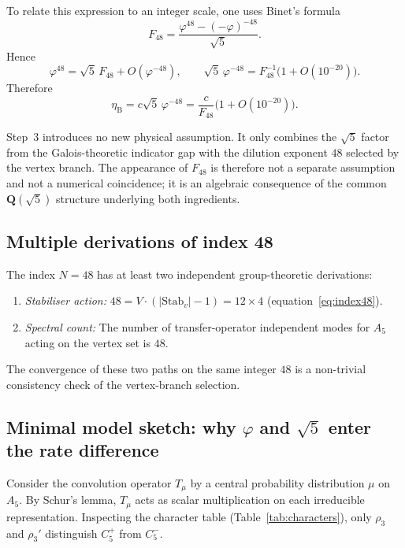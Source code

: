 \documentclass[sn-mathphys-num,Numbered]{sn-jnl}
\theoremstyle{thmstyleone}
\theoremstyle{thmstylethree}
\theoremstyle{thmstyletwo}
\newcommand{\etaB}{\eta_{\mathrm{B}}}
\begin{document}
To relate this expression to an integer scale, one uses Binet's formula
\[
F_{48}=\frac{\varphi^{48}-(-\varphi)^{-48}}{\sqrt{5}}.
\]
Hence
\[
\varphi^{48}=\sqrt{5}\,F_{48}+O(\varphi^{-48}),
\qquad
\sqrt{5}\,\varphi^{-48}=F_{48}^{-1}\bigl(1+O(10^{-20})\bigr).
\]
Therefore
\[
\etaB = c\sqrt{5}\,\varphi^{-48}
     = \frac{c}{F_{48}}\bigl(1+O(10^{-20})\bigr).
\]

Step~3 introduces no new physical assumption. It only combines the
$\sqrt{5}$ factor from the Galois-theoretic indicator gap with the
dilution exponent $48$ selected by the vertex branch. The appearance of
$F_{48}$ is therefore not a separate assumption and not a numerical
coincidence; it is an algebraic consequence of the common
$\mathbf{Q}(\sqrt{5})$ structure underlying both ingredients.

\subsection{Multiple derivations of index 48}
\label{ssec:index-48}

The index $N = 48$ has at least two independent group-theoretic
derivations:
\begin{enumerate}
  \item \textit{Stabiliser action:}
    $48 = V \cdot (|\mathrm{Stab}_v| - 1) = 12 \times 4$
    (equation~\eqref{eq:index48}).
  \item \textit{Spectral count:}
    The number of transfer-operator independent modes for $A_5$ acting
    on the vertex set is $48$.
\end{enumerate}
The convergence of these two paths on the same integer $48$ is a
non-trivial consistency check of the vertex-branch selection.

\subsection{Minimal model sketch: why \texorpdfstring{$\varphi$}{phi}
  and \texorpdfstring{$\sqrt{5}$}{sqrt5} enter the rate difference}
\label{ssec:model-sketch}

Consider the convolution operator $T_\mu$ by a central probability
distribution $\mu$ on $A_5$.  By Schur's lemma, $T_\mu$ acts as scalar
multiplication on each irreducible representation.  Inspecting the
character table (Table~\ref{tab:characters}), only $\rho_3$ and
$\rho_3'$ distinguish $C_5^+$ from $C_5^-$.
\end{document}
